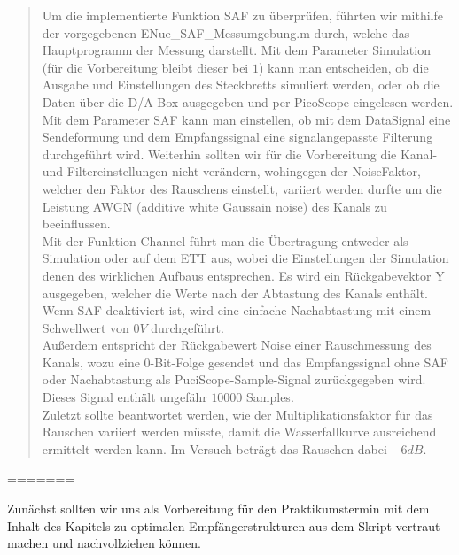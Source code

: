 \begin{quote}
    
    Um die implementierte Funktion SAF zu überprüfen, führten wir mithilfe der
    vorgegebenen ENue\_SAF\_Messumgebung.m durch, welche das Hauptprogramm der
    Messung darstellt. Mit dem Parameter Simulation (für die Vorbereitung
    bleibt dieser bei $1$) kann man entscheiden, ob die Ausgabe und
    Einstellungen des Steckbretts simuliert werden, oder ob die Daten über die 
    D/A-Box ausgegeben und per PicoScope eingelesen werden. Mit dem Parameter
    SAF kann man einstellen, ob mit dem DataSignal eine Sendeformung und dem
    Empfangssignal eine signalangepasste Filterung durchgeführt wird. Weiterhin
    sollten wir für die Vorbereitung die Kanal- und Filtereinstellungen nicht
    verändern, wohingegen der NoiseFaktor, welcher den Faktor des Rauschens
    einstellt, variiert werden durfte um die Leistung AWGN (additive white
    Gaussain noise) des Kanals zu beeinflussen.\\
    Mit der Funktion Channel führt man die Übertragung entweder als
    Simulation oder auf dem ETT aus, wobei die Einstellungen der Simulation
    denen des wirklichen Aufbaus entsprechen. Es wird ein Rückgabevektor Y
    ausgegeben, welcher die Werte nach der Abtastung des Kanals enthält.
    Wenn SAF deaktiviert ist, wird eine einfache Nachabtastung mit einem
    Schwellwert von $0V$ durchgeführt.\\
    Außerdem entspricht der Rückgabewert Noise einer Rauschmessung des Kanals,
    wozu eine 0-Bit-Folge gesendet und das Empfangssignal ohne SAF oder
    Nachabtastung als PuciScope-Sample-Signal zurückgegeben wird. Dieses Signal
    enthält ungefähr $10000$ Samples.\\
    
    
    Zuletzt sollte beantwortet werden, wie der Multiplikationsfaktor für das
    Rauschen variiert werden müsste, damit die Wasserfallkurve ausreichend ermittelt werden kann.
    Im Versuch beträgt das Rauschen dabei $-6 dB$.
    
    \end{quote}%
=======
	
	Zunächst sollten wir uns als Vorbereitung für den Praktikumstermin mit dem
	Inhalt des Kapitels zu optimalen Empfängerstrukturen aus dem Skript vertraut
	machen und nachvollziehen können.\\
	
